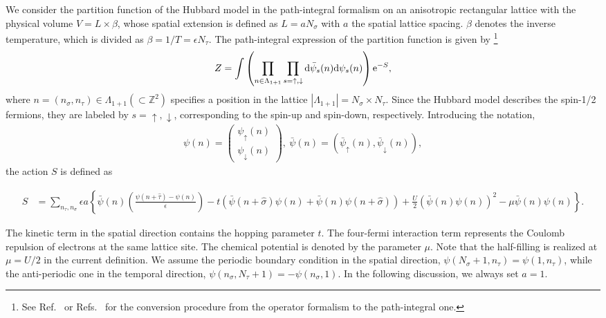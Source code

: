 \documentclass[nofootinbib,prd,aps,superscriptaddress,preprintnumbers,twocolumn,showpacs]{revtex4-1}
\begin{document}
We consider the partition function of the Hubbard model in the path-integral formalism on an anisotropic rectangular lattice with the physical volume $V=L\times \beta$, whose spatial extension is defined as $L=aN_{\sigma}$ with $a$ the spatial lattice spacing. $\beta$ denotes the inverse temperature, which is divided as $\beta=1/T=\epsilon N_\tau$.
The path-integral expression of the partition function is given by \footnote{See Ref.~\cite{Creutz:1986ky} or Refs.~\cite{10.2307/2033649,Suzuki:1976be} for the conversion procedure from the operator formalism to the path-integral one.} 
\begin{align}
	Z=\int\left(\prod_{n\in\Lambda_{1+1}}\prod_{s=\uparrow,\downarrow}{\rm d}\bar{\psi}_{s}(n){\rm d}\psi_{s}(n)\right){\rm e}^{-S},
	\label{eq:Z}
\end{align}
where $n=(n_{\sigma},n_{\tau})\in\Lambda_{1+1}(\subset\mathbb{Z}^2)$ specifies a position in the lattice $|\Lambda_{1+1}|=N_\sigma\times N_\tau$. Since the Hubbard model describes the spin-1/2 fermions, they are labeled by $s=\uparrow,\downarrow$, corresponding to the spin-up and spin-down, respectively. Introducing the notation,
\begin{align}
	\psi(n)=\left(
	\begin{array}{c}
	 	\psi_\uparrow(n)\\ \psi_\downarrow(n) 
	\end{array}
	\right),
	~\bar{\psi}(n)=\left(\bar{\psi}_\uparrow(n),\bar{\psi}_\downarrow(n)\right),
\end{align}
the action $S$ is defined as
\begin{widetext}
\begin{align}
\label{eq:action}
        	S&=\sum_{n_\tau,n_{\sigma}}\epsilon a\left\{\bar{\psi}(n)\left(\frac{\psi(n+{\hat \tau})-\psi(n)}{\epsilon}\right)-t\left(\bar{\psi}(n+{\hat\sigma})\psi(n)+\bar{\psi}(n)\psi(n+{\hat\sigma})\right)+\frac{U}{2}\left(\bar{\psi}(n)\psi(n)\right)^2-\mu\bar{\psi}(n)\psi(n)\right\}.
\end{align}
\end{widetext}
The kinetic term in the spatial direction contains the hopping parameter $t$. The four-fermi interaction term represents the Coulomb repulsion of electrons at the same lattice site. The chemical potential is denoted by the parameter $\mu$. Note that the half-filling is realized at $\mu=U/2$ in the current definition. We assume the periodic boundary condition in the spatial direction, $\psi(N_{\sigma}+1,n_\tau)=\psi(1,n_\tau)$, while the anti-periodic one in the temporal direction, $\psi(n_{\sigma},N_\tau+1)=-\psi(n_{\sigma},1)$. In the following discussion, we always set $a=1$.
\end{document}
